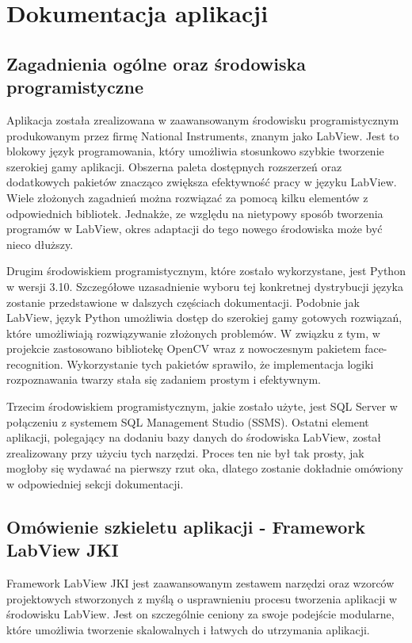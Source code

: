 \documentclass{report}
\begin{document}
\section{\LARGE Dokumentacja aplikacji}

\subsection{\Large Zagadnienia ogólne oraz środowiska programistyczne}
Aplikacja została zrealizowana w zaawansowanym środowisku programistycznym produkowanym przez firmę National Instruments, znanym jako LabView. Jest to blokowy język programowania, który umożliwia stosunkowo szybkie tworzenie szerokiej gamy aplikacji. Obszerna paleta dostępnych rozszerzeń oraz dodatkowych pakietów znacząco zwiększa efektywność pracy w języku LabView. Wiele złożonych zagadnień można rozwiązać za pomocą kilku elementów z odpowiednich bibliotek. Jednakże, ze względu na nietypowy sposób tworzenia programów w LabView, okres adaptacji do tego nowego środowiska może być nieco dłuższy.

Drugim środowiskiem programistycznym, które zostało wykorzystane, jest Python w wersji 3.10. Szczegółowe uzasadnienie wyboru tej konkretnej dystrybucji języka zostanie przedstawione w dalszych częściach dokumentacji. Podobnie jak LabView, język Python umożliwia dostęp do szerokiej gamy gotowych rozwiązań, które umożliwiają rozwiązywanie złożonych problemów. W związku z tym, w projekcie zastosowano bibliotekę OpenCV wraz z nowoczesnym pakietem face-recognition. Wykorzystanie tych pakietów sprawiło, że implementacja logiki rozpoznawania twarzy stała się zadaniem prostym i efektywnym.

Trzecim środowiskiem programistycznym, jakie zostało użyte, jest SQL Server w połączeniu z systemem SQL Management Studio (SSMS). Ostatni element aplikacji, polegający na dodaniu bazy danych do środowiska LabView, został zrealizowany przy użyciu tych narzędzi. Proces ten nie był tak prosty, jak mogłoby się wydawać na pierwszy rzut oka, dlatego zostanie dokładnie omówiony w odpowiedniej sekcji dokumentacji.


\subsection{\Large Omówienie szkieletu aplikacji - Framework LabView JKI}

Framework LabView JKI jest zaawansowanym zestawem narzędzi oraz wzorców projektowych stworzonych z myślą o usprawnieniu procesu tworzenia aplikacji w środowisku LabView. Jest on szczególnie ceniony za swoje podejście modularne, które umożliwia tworzenie skalowalnych i łatwych do utrzymania aplikacji.
\end{document}
